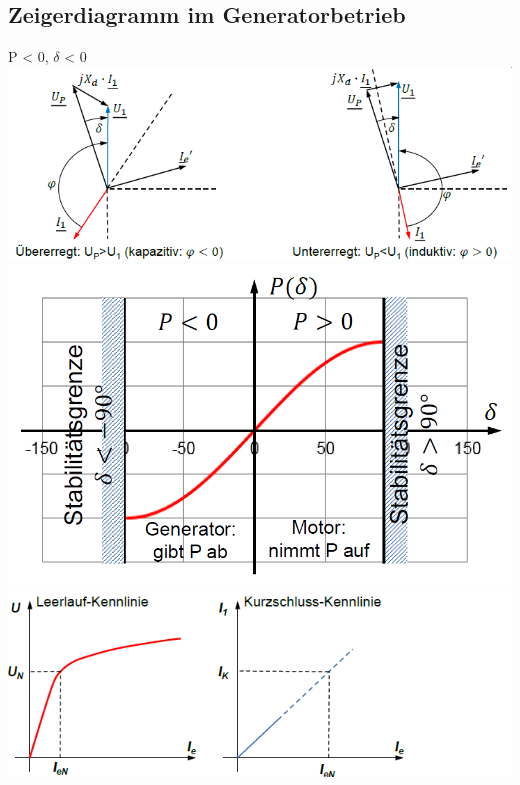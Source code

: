 \subsection{Zeigerdiagramm im Generatorbetrieb}
    P < 0, $\delta$ < 0  \newline
    \includegraphics[width = 12 cm]{images/ZeigerdiagrammGeneratorbetrieb} \newline \newline
    \includegraphics[scale = 0.35]{images/Stabilitaet}
    \includegraphics[scale = 0.7]{images/KennlinieSynchronmaschine}
\clearpage
\pagebreak
